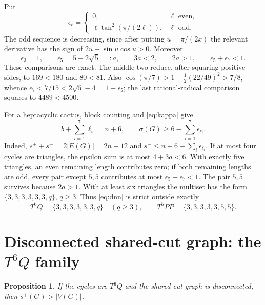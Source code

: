\documentclass[11pt]{article}
\newtheorem{proposition}[theorem]{Proposition}
\newcommand{\spE}{s^+}
\newcommand{\smE}{s^-}
\newcommand{\sig}{\sigma}
\begin{document}
Put
\[
 \epsilon_\ell=
 \begin{cases}
 0,&\ell\text{ even},\\
 \ell\tan^2(\pi/(2\ell)),&\ell\text{ odd}.
 \end{cases}
\]
The odd sequence is decreasing, since after putting $u=\pi/(2x)$ the relevant
derivative has the sign of $2u-\sin u\cos u>0$.  Moreover
\begin{equation}\label{eq:epsilon}
 \epsilon_3=1,
 \qquad \epsilon_5=5-2\sqrt5=:a,
 \qquad 3a<2,
 \qquad 2a>1,
 \qquad \epsilon_5+\epsilon_7<1.
\end{equation}
These comparisons are exact.  The middle two reduce, after squaring positive
sides, to $169<180$ and $80<81$.  Also
$\cos(\pi/7)>1-\tfrac12(22/49)^2>7/8$, whence
$\epsilon_7<7/15<2\sqrt5-4=1-\epsilon_5$; the last rational-radical
comparison squares to $4489<4500$.

For a heptacyclic cactus, block counting and \eqref{eq:kappa} give
\[
 b+\sum_{i=1}^7\ell_i=n+6,
 \qquad
 \sig(G)\geq6-\sum_{i=1}^7\epsilon_{\ell_i}.
 \tag{4.1}\label{eq:dnn}
\]
Indeed, $\spE+\smE=2|E(G)|=2n+12$ and
$\smE\leq n+6+\sum_i\epsilon_{\ell_i}$.  If at most four cycles are
triangles, the epsilon sum is at most $4+3a<6$.  With exactly five triangles,
an even remaining length contributes zero; if both remaining lengths are odd,
every pair except $5,5$ contributes at most
$\epsilon_5+\epsilon_7<1$.  The pair $5,5$ survives because $2a>1$.  With at
least six triangles the multiset has the form $\{3,3,3,3,3,3,q\}$, $q\geq3$.
Thus \eqref{eq:dnn} is strict outside exactly
\begin{equation}\label{eq:residual}
 T^6Q=\{3,3,3,3,3,3,q\}\quad(q\geq3),
 \qquad
 T^5PP=\{3,3,3,3,3,5,5\}.
\end{equation}

\section{Disconnected shared-cut graph: the $T^6Q$ family}

\begin{proposition}\label{prop:disconnected-t6q}
If the cycles are $T^6Q$ and the shared-cut graph is disconnected, then
$\spE(G)>|V(G)|$.
\end{proposition}
\end{document}
